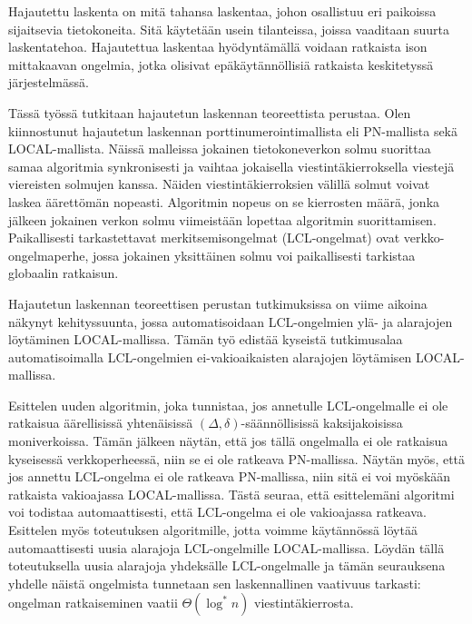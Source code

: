 \begin{abstractpage}[finnish]
Hajautettu laskenta on mitä tahansa laskentaa, johon osallistuu eri paikoissa sijaitsevia tietokoneita.
Sitä käytetään usein tilanteissa, joissa vaaditaan suurta laskentatehoa.
Hajautettua laskentaa hyödyntämällä voidaan ratkaista ison mittakaavan ongelmia, jotka olisivat epäkäytännöllisiä ratkaista keskitetyssä järjestelmässä.

Tässä työssä tutkitaan hajautetun laskennan teoreettista perustaa.
Olen kiinnostunut hajautetun laskennan porttinumerointimallista eli PN-mallista sekä LOCAL-mallista.
Näissä malleissa jokainen tietokoneverkon solmu suorittaa samaa algoritmia synkronisesti ja vaihtaa jokaisella viestintäkierroksella viestejä viereisten solmujen kanssa.
Näiden viestintäkierroksien välillä solmut voivat laskea äärettömän nopeasti.
Algoritmin nopeus on se kierrosten määrä, jonka jälkeen jokainen verkon solmu viimeistään lopettaa algoritmin suorittamisen.
Paikallisesti tarkastettavat merkitsemisongelmat (LCL-ongelmat) ovat verkko-ongelmaperhe, jossa jokainen yksittäinen solmu voi paikallisesti tarkistaa globaalin ratkaisun.

Hajautetun laskennan teoreettisen perustan tutkimuksissa on viime aikoina näkynyt kehityssuunta, jossa automatisoidaan LCL-ongelmien ylä- ja alarajojen löytäminen LOCAL-mallissa.
Tämän työ edistää kyseistä tutkimusalaa automatisoimalla LCL-ongelmien ei-vakioaikaisten alarajojen löytämisen LOCAL-mallissa.

Esittelen uuden algoritmin, joka tunnistaa, jos annetulle LCL-ongelmalle ei ole ratkaisua äärellisissä yhtenäisissä $(\Delta, \delta)$-säännöllisissä kaksijakoisissa moniverkoissa.
Tämän jälkeen näytän, että jos tällä ongelmalla ei ole ratkaisua kyseisessä verkkoperheessä, niin se ei ole ratkeava PN-mallissa.
Näytän myös, että jos annettu LCL-ongelma ei ole ratkeava PN-mallissa, niin sitä ei voi myöskään ratkaista vakioajassa LOCAL-mallissa.
Tästä seuraa, että esittelemäni algoritmi voi todistaa automaattisesti, että LCL-ongelma ei ole vakioajassa ratkeava.
Esittelen myös toteutuksen algoritmille, jotta voimme käytännössä löytää automaattisesti uusia alarajoja LCL-ongelmille LOCAL-mallissa.
Löydän tällä toteutuksella uusia alarajoja yhdeksälle LCL-ongelmalle ja tämän seurauksena yhdelle näistä ongelmista tunnetaan sen laskennallinen vaativuus tarkasti: ongelman ratkaiseminen vaatii $\Theta(\log^* n)$ viestintäkierrosta.
\end{abstractpage}
